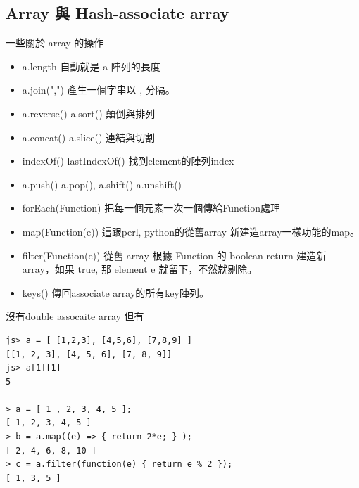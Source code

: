 \subsection{Array 與 Hash-associate array}
一些關於 array 的操作
\begin{itemize}
  \item a.length 自動就是 a 陣列的長度
  \item a.join(",") 產生一個字串以 , 分隔。
  \item a.reverse() a.sort() 顛倒與排列
  \item a.concat() a.slice() 連結與切割
  \item indexOf() lastIndexOf() 找到element的陣列index
  \item a.push() a.pop(), a.shift() a.unshift()
  \item forEach(Function) 把每一個元素一次一個傳給Function處理
  \item map(Function(e)) 這跟perl, python的從舊array 新建造array一樣功能的map。
  \item filter(Function(e)) 從舊 array 根據 Function 的 boolean return 
    建造新 array，如果 true, 那 element e 就留下，不然就剔除。
  \item keys() 傳回associate array的所有key陣列。
\end{itemize}
沒有double assocaite array 但有
\begin{verbatim}
js> a = [ [1,2,3], [4,5,6], [7,8,9] ]
[[1, 2, 3], [4, 5, 6], [7, 8, 9]]
js> a[1][1]
5

> a = [ 1 , 2, 3, 4, 5 ];
[ 1, 2, 3, 4, 5 ]
> b = a.map((e) => { return 2*e; } );
[ 2, 4, 6, 8, 10 ]
> c = a.filter(function(e) { return e % 2 });
[ 1, 3, 5 ]
\end{verbatim}

